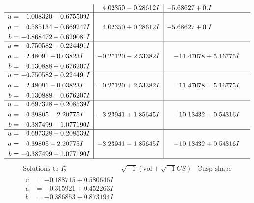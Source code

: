 \documentclass[1p]{elsarticle_modified}
\theoremstyle{definition}
\newcommand{\I}{\sqrt{-1}}
\begin{document}
$$\begin{array}{c|c|c}
 & \phantom{-}4.02350 - 0.28612 I & -5.68627 + 0. I\phantom{ +0.000000I} \\ \hline\begin{aligned}
u &= \phantom{-}1.008320 - 0.675509 I \\
a &= \phantom{-}0.585134 - 0.669247 I \\
b &= -0.868472 + 0.629081 I\end{aligned}
 & \phantom{-}4.02350 + 0.28612 I & -5.68627 + 0. I\phantom{ +0.000000I} \\ \hline\begin{aligned}
u &= -0.750582 + 0.224491 I \\
a &= \phantom{-}2.48091 + 0.03823 I \\
b &= \phantom{-}0.130888 + 0.676207 I\end{aligned}
 & -0.27120 - 2.53382 I & -11.47078 + 5.16775 I \\ \hline\begin{aligned}
u &= -0.750582 - 0.224491 I \\
a &= \phantom{-}2.48091 - 0.03823 I \\
b &= \phantom{-}0.130888 - 0.676207 I\end{aligned}
 & -0.27120 + 2.53382 I & -11.47078 - 5.16775 I \\ \hline\begin{aligned}
u &= \phantom{-}0.697328 + 0.208539 I \\
a &= \phantom{-}0.39805 - 2.20775 I \\
b &= -0.387499 - 1.077190 I\end{aligned}
 & -3.23941 + 1.85645 I & -10.13432 - 0.54316 I \\ \hline\begin{aligned}
u &= \phantom{-}0.697328 - 0.208539 I \\
a &= \phantom{-}0.39805 + 2.20775 I \\
b &= -0.387499 + 1.077190 I\end{aligned}
 & -3.23941 - 1.85645 I & -10.13432 + 0.54316 I\\
 \hline 
 \end{array}$$\newpage$$\begin{array}{c|c|c}  
\text{Solutions to }I^u_{2}& \I (\text{vol} + \sqrt{-1}CS) & \text{Cusp shape}\\
 \hline 
\begin{aligned}
u &= -0.188715 + 0.580646 I \\
a &= -0.315921 + 0.452263 I \\
b &= -0.386853 - 0.873194 I\end{aligned}

\end{array}$$
\end{document}
